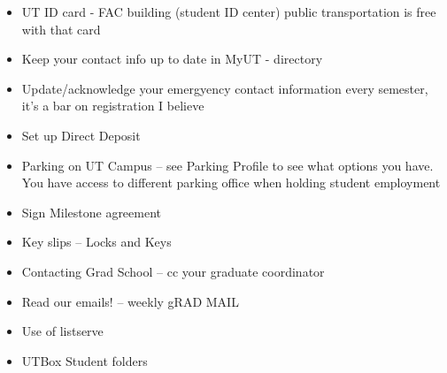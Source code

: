 \begin{itemize}
	\item UT ID card - FAC building (student ID center) public transportation is free with that card
	\item Keep your contact info up to date in MyUT - directory
	\item Update/acknowledge your emergyency contact information every semester, it's a bar on registration I believe
	\item Set up Direct Deposit
	\item Parking on UT Campus -- see Parking Profile to see what options you have. You have access to different parking office when holding student employment
	\item Sign Milestone agreement
	\item Key slips -- Locks and Keys
	\item Contacting Grad School -- cc your graduate coordinator
	\item Read our emails! -- weekly gRAD MAIL
	\item Use of listserve
	\item UTBox Student folders
\end{itemize}


\printbibliography


